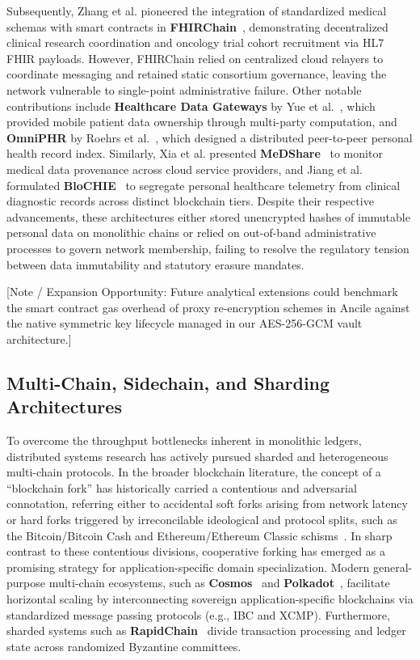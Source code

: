 Subsequently, Zhang et al. pioneered the integration of standardized medical schemas with smart contracts in \textbf{FHIRChain}~\cite{zhang2018fhirchain}, demonstrating decentralized clinical research coordination and oncology trial cohort recruitment via HL7 FHIR payloads. However, FHIRChain relied on centralized cloud relayers to coordinate messaging and retained static consortium governance, leaving the network vulnerable to single-point administrative failure. Other notable contributions include \textbf{Healthcare Data Gateways} by Yue et al.~\cite{yue2016healthcare}, which provided mobile patient data ownership through multi-party computation, and \textbf{OmniPHR} by Roehrs et al.~\cite{roehrs2017omniphr}, which designed a distributed peer-to-peer personal health record index. Similarly, Xia et al. presented \textbf{MeDShare}~\cite{xia2017medshare} to monitor medical data provenance across cloud service providers, and Jiang et al. formulated \textbf{BloCHIE}~\cite{jiang2018blochie} to segregate personal healthcare telemetry from clinical diagnostic records across distinct blockchain tiers. Despite their respective advancements, these architectures either stored unencrypted hashes of immutable personal data on monolithic chains or relied on out-of-band administrative processes to govern network membership, failing to resolve the regulatory tension between data immutability and statutory erasure mandates.

[Note / Expansion Opportunity: Future analytical extensions could benchmark the smart contract gas overhead of proxy re-encryption schemes in Ancile against the native symmetric key lifecycle managed in our AES-256-GCM vault architecture.]

\subsection{Multi-Chain, Sidechain, and Sharding Architectures}
To overcome the throughput bottlenecks inherent in monolithic ledgers, distributed systems research has actively pursued sharded and heterogeneous multi-chain protocols. In the broader blockchain literature, the concept of a ``blockchain fork'' has historically carried a contentious and adversarial connotation, referring either to accidental soft forks arising from network latency or hard forks triggered by irreconcilable ideological and protocol splits, such as the Bitcoin/Bitcoin Cash and Ethereum/Ethereum Classic schisms~\cite{nakamoto2008bitcoin, wood2014ethereum, atzei2017survey}. In sharp contrast to these contentious divisions, cooperative forking has emerged as a promising strategy for application-specific domain specialization. Modern general-purpose multi-chain ecosystems, such as \textbf{Cosmos}~\cite{kwon2019cosmos} and \textbf{Polkadot}~\cite{wood2016polkadot}, facilitate horizontal scaling by interconnecting sovereign application-specific blockchains via standardized message passing protocols (e.g., IBC and XCMP). Furthermore, sharded systems such as \textbf{RapidChain}~\cite{zamani2018rapidchain} divide transaction processing and ledger state across randomized Byzantine committees. 

